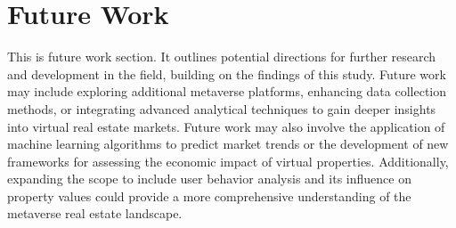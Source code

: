 \section{Future Work}
This is future work section. It outlines potential directions for further research and development in the field, building on the findings of this study. Future work may include exploring additional metaverse platforms, enhancing data collection methods, or integrating advanced analytical techniques to gain deeper insights into virtual real estate markets.
Future work may also involve the application of machine learning algorithms to predict market trends or the development of new frameworks for assessing the economic impact of virtual properties. Additionally, expanding the scope to include user behavior analysis and its influence on property values could provide a more comprehensive understanding of the metaverse real estate landscape.